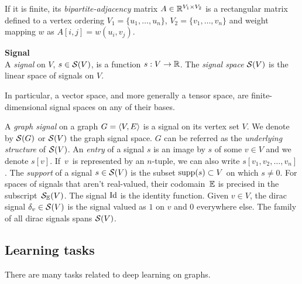If it is finite, its \emph{bipartite-adjacency} matrix $A \in \mathbb{R}^{V_1 \times V_2}$ is a rectangular matrix defined \wrt to a vertex ordering $V_1 = \{u_1, \ldots, u_n\}$, $V_2 = \{v_1, \ldots, v_n\}$ and weight mapping $w$ as $A[i,j] = w(u_i,v_j)$.

\begin{definition}\textbf{Signal}\\
A \emph{signal} on $V$, $s \in \mathcal{S}(V)$, is a function $s: V \rightarrow \mathbb{R}$.
The \emph{signal space} $\mathcal{S}(V)$ is the linear space of signals on $V$.
\end{definition}

\begin{remark}
In particular, a vector space, and more generally a tensor space, are finite-dimensional signal spaces on any of their bases.
\end{remark}

A \emph{graph signal} on a graph $G = \langle V, E \rangle$ is a signal on its vertex set $V$. We denote by $\mathcal{S}(G)$ or $\mathcal{S}(V)$ the graph signal space. $G$ can be referred as the \emph{underlying structure} of $\mathcal{S}(V)$.
An \emph{entry} of a signal $s$ is an image by $s$ of some $v \in V$ and we denote $s[v]$. If~$v$~is represented by an $n$-tuple, we can also write $s[v_1, v_2, \ldots, v_n]$.
The \emph{support} of a signal $s \in \mathcal{S}(V)$ is the subset $\operatorname{supp}(s) \subset V$ on which $s \neq 0$.
For spaces of signals that aren't real-valued, their codomain~$\mathbb{E}$ is precised in the subscript~$\mathcal{S}_{\mathbb{E}}(V)$.
The signal $\operatorname{Id}$ is the identity function.
Given $v \in V$, the dirac signal $\delta_v \in \mathcal{S}(V)$ is the signal valued as $1$ on $v$ and $0$ everywhere else. The family of all dirac signals spans $\mathcal{S}(V)$.

\subsection{Learning tasks}


There are many tasks related to deep learning on graphs.%

